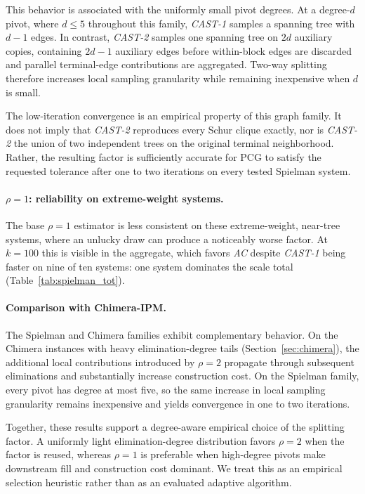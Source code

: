 \documentclass{article}
\newcommand{\CASTone}{\textit{CAST-1}\xspace}
\newcommand{\CASTtwo}{\textit{CAST-2}\xspace}
\newcommand{\AC}{\textit{AC}\xspace}
\newcommand{\1}{\mathbbm{1}}
\theoremstyle{plain}
\begin{document}
This behavior is associated with the uniformly small pivot degrees.
At a degree-$d$ pivot, where $d\leq5$ throughout this family,
\CASTone samples a spanning tree with $d-1$ edges. In contrast,
\CASTtwo samples one spanning tree on $2d$ auxiliary copies,
containing $2d-1$ auxiliary edges before within-block edges are
discarded and parallel terminal-edge contributions are aggregated.
Two-way splitting therefore increases local sampling
granularity while remaining inexpensive when $d$ is small.

The low-iteration convergence is an empirical property of this graph
family. It does not imply that \CASTtwo reproduces every Schur clique
exactly, nor is \CASTtwo the union of two independent trees on the
original terminal neighborhood. Rather, the resulting factor is
sufficiently accurate for PCG to satisfy the requested tolerance
after one to two iterations on every tested Spielman system.

\paragraph{$\rho=1$: reliability on extreme-weight systems.}
The base $\rho=1$ estimator is less consistent on these
extreme-weight, near-tree systems, where an unlucky draw can produce a
noticeably worse factor. At $k=100$ this is visible in the aggregate,
which favors \AC{} despite \CASTone{} being faster on nine of ten
systems: one system dominates the scale total
(Table~\ref{tab:spielman_tot}).


\paragraph{Comparison with Chimera-IPM.}
The Spielman and Chimera families exhibit complementary behavior. On
the Chimera instances with heavy elimination-degree tails
(Section~\ref{sec:chimera}), the additional local contributions
introduced by $\rho=2$ propagate through subsequent eliminations and
substantially increase construction cost. On the Spielman family,
every pivot has degree at most five, so the same increase in local
sampling granularity remains inexpensive and yields convergence in one to two iterations.




Together, these results support a degree-aware empirical choice of
the splitting factor. A uniformly light elimination-degree
distribution favors $\rho=2$ when the factor is reused, whereas
$\rho=1$ is preferable when high-degree pivots make downstream fill
and construction cost dominant. We treat this as an empirical
selection heuristic rather than as an evaluated adaptive algorithm.
\end{document}
